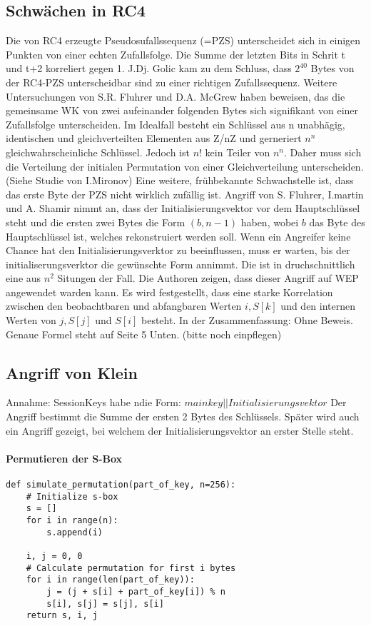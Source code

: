 \documentclass[10pt,a4paper]{article}
\begin{document}
\subsection{Schwächen in RC4}
Die von RC4 erzeugte Pseudosufallssequenz (=PZS) unterscheidet sich in einigen Punkten von einer echten Zufallsfolge. Die Summe der letzten Bits in Schrit t und t+2 korreliert gegen 1. J.Dj. Golic kam zu dem Schluss, dass $2^40$ Bytes von der RC4-PZS unterscheidbar sind zu einer richtigen Zufallssequenz.
Weitere Untersuchungen von S.R. Fluhrer und D.A. McGrew haben beweisen, das die gemeinsame WK von zwei aufeinander folgenden Bytes sich signifikant von einer Zufallsfolge unterscheiden. Im Idealfall besteht ein Schlüssel aus n unabhägig, identischen und gleichverteilten Elementen aus Z/nZ und gerneriert $n^n$ gleichwahrscheinliche Schlüssel. Jedoch ist $n!$ kein Teiler von $n^n$. Daher muss sich die Verteilung der initialen Permutation von einer Gleichverteilung unterscheiden. (Siehe Studie von I.Mironov)
Eine weitere, frühbekannte Schwachstelle ist, dass das erste Byte der PZS nicht wirklich zufällig ist. Angriff von S. Fluhrer, I.martin und A. Shamir nimmt an, dass der Initialisierungsvektor vor dem Hauptschlüssel steht und die ersten zwei Bytes die Form $(b,n-1)$ haben, wobei $b$ das Byte des Hauptschlüssel ist, welches rekonstruiert werden soll. Wenn ein Angreifer keine Chance hat den Initialisierungsverktor zu beeinflussen, muss er warten, bis der initialiserungsverktor die gewünschte Form annimmt. Die ist in druchschnittlich eine aus $n^2$ Situngen der Fall. Die Authoren zeigen, dass dieser Angriff auf WEP angewendet warden kann.
Es wird festgestellt, dass eine starke Korrelation zwischen den beobachtbaren und abfangbaren Werten $i, S[k]$ und den internen Werten von $j, S[j]$ und $S[i]$ besteht. In der Zusammenfassung: Ohne Beweis.
Genaue Formel steht auf Seite 5 Unten. (bitte noch einpflegen)

\subsection{Angriff von Klein}
Annahme: SessionKeys habe ndie Form: $main key || Initialisierungsvektor$
Der Angriff bestimmt die Summe der ersten 2 Bytes des Schlüssels. Später wird auch ein Angriff gezeigt, bei welchem der Initialisierungsvektor an erster Stelle steht. 
\paragraph{Permutieren der S-Box} %
\begin{lstlisting}
def simulate_permutation(part_of_key, n=256):
    # Initialize s-box
    s = []
    for i in range(n):
        s.append(i)

    i, j = 0, 0
    # Calculate permutation for first i bytes
    for i in range(len(part_of_key)):
        j = (j + s[i] + part_of_key[i]) % n
        s[i], s[j] = s[j], s[i]
    return s, i, j
\end{lstlisting}
\end{document}
